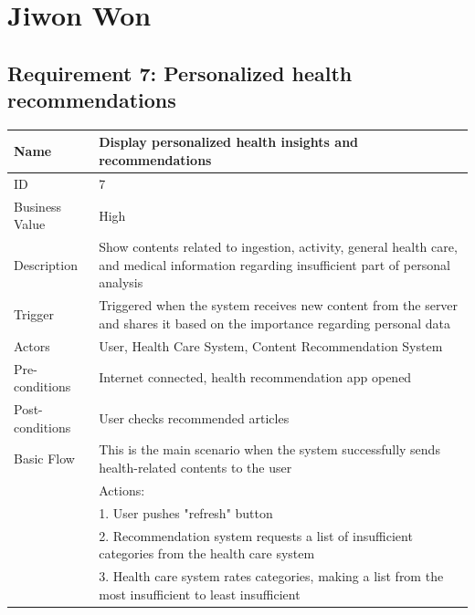 \documentclass{article}
\begin{document}
		\section{Jiwon Won}
		\subsection{Requirement 7: Personalized health recommendations}
		
		\begin{table}[htbp]
			\centering
			\small
			\begin{tabularx}{\textwidth}{|>{\raggedright\arraybackslash}p{}|X|}
				\hline
				Name             & Display personalized health insights and recommendations                                \\ \hline
				ID               & 7                                                                                       \\ \hline
				Business Value   & High                                                                                    \\ \hline
				Description      & Show contents related to ingestion, activity, general health care, and medical information regarding insufficient part of personal analysis \\ \hline
				Trigger          & Triggered when the system receives new content from the server and shares it based on the importance regarding personal data \\ \hline
				Actors           & User, Health Care System, Content Recommendation System                                 \\ \hline
				Pre-conditions   & Internet connected, health recommendation app opened                                    \\ \hline
				Post-conditions  & User checks recommended articles                                                         \\ \hline
				Basic Flow       & This is the main scenario when the system successfully sends health-related contents to the user \\ \hline
								 & Actions: \\
								 & 1. User pushes "refresh" button \\
								 & 2. Recommendation system requests a list of insufficient categories from the health care system \\
								 & 3. Health care system rates categories, making a list from the most insufficient to least insufficient \\

\end{tabularx}
\end{table}
\end{document}
